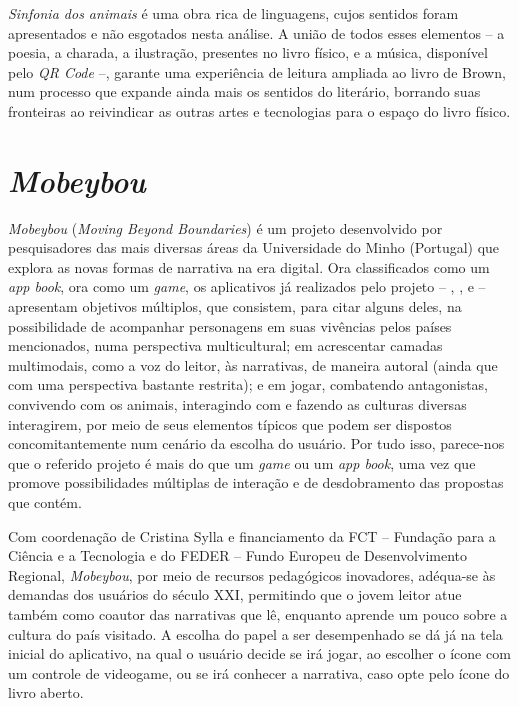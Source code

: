 \documentclass[portuguese]{textolivre}
\begin{document}
\textit{Sinfonia dos animais} é uma obra rica de linguagens, cujos sentidos
foram apresentados e não esgotados nesta análise. A união de todos esses
elementos – a poesia, a charada, a ilustração, presentes no livro físico, e a
música, disponível pelo \textit{QR Code} –, garante uma experiência de leitura
ampliada ao livro de Brown, num processo que expande ainda mais os sentidos do
literário, borrando suas fronteiras ao reivindicar as outras artes e
tecnologias para o espaço do livro físico.

\section{\textit{Mobeybou}}\label{sec-formato}

\textit{Mobeybou} (\textit{Moving Beyond Boundaries}) é um projeto desenvolvido
por pesquisadores das mais diversas áreas da Universidade do Minho (Portugal)
que explora as novas formas de narrativa na era digital. Ora classificados como
um \textit{app book}, ora como um \textit{game}, os aplicativos já realizados
pelo projeto --
,
,
e
--
apresentam objetivos múltiplos, que consistem, para citar alguns deles, na
possibilidade de acompanhar personagens em suas vivências pelos países
mencionados, numa perspectiva multicultural; em acrescentar camadas
multimodais, como a voz do leitor, às narrativas, de maneira autoral (ainda que
com uma perspectiva bastante restrita); e em jogar, combatendo antagonistas,
convivendo com os animais, interagindo com e fazendo as culturas diversas
interagirem, por meio de seus elementos típicos que podem ser dispostos
concomitantemente num cenário da escolha do usuário. Por tudo isso, parece-nos
que o referido projeto é mais do que um \textit{game} ou um \textit{app book},
uma vez que promove possibilidades múltiplas de interação e de desdobramento
das propostas que contém.

Com coordenação de Cristina Sylla e financiamento da FCT – Fundação para a
Ciência e a Tecnologia e do FEDER – Fundo Europeu de Desenvolvimento Regional,
\textit{Mobeybou}, por meio de recursos pedagógicos inovadores, adéqua-se às
demandas dos usuários do século XXI, permitindo que o jovem leitor atue também
como coautor das narrativas que lê, enquanto aprende um pouco sobre a cultura
do país visitado. A escolha do papel a ser desempenhado se dá já na tela
inicial do aplicativo, na qual o usuário decide se irá jogar, ao escolher o
ícone com um controle de videogame, ou se irá conhecer a narrativa, caso opte
pelo ícone do livro aberto. 
\end{document}
